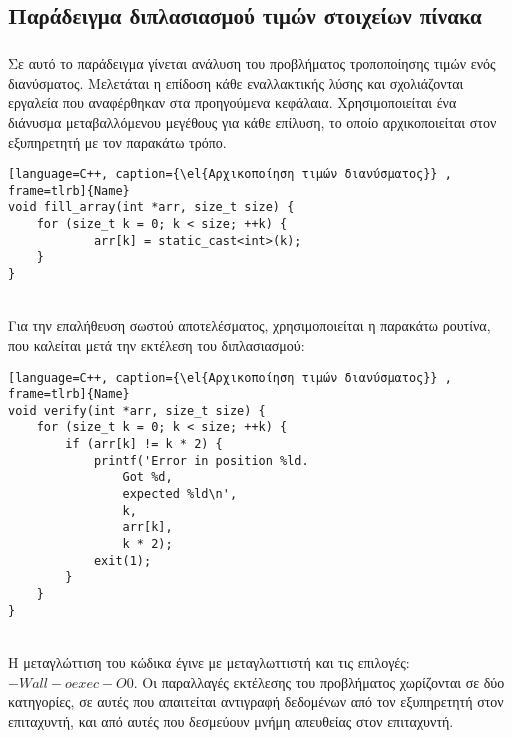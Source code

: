 \subsection{Παράδειγμα διπλασιασμού τιμών στοιχείων πίνακα}
\subparagraph{}
Σε αυτό το παράδειγμα γίνεται ανάλυση του προβλήματος τροποποίησης τιμών ενός διανύσματος. Μελετάται η επίδοση κάθε εναλλακτικής λύσης και σχολιάζονται εργαλεία που αναφέρθηκαν στα προηγούμενα κεφάλαια. Χρησιμοποιείται ένα διάνυσμα μεταβαλλόμενου μεγέθους για κάθε επίλυση, το οποίο αρχικοποιείται στον εξυπηρετητή με τον παρακάτω τρόπο.
\begin{lstlisting}[language=C++, caption={\el{Αρχικοποίηση τιμών διανύσματος}} , frame=tlrb]{Name}
void fill_array(int *arr, size_t size) {
    for (size_t k = 0; k < size; ++k) {
            arr[k] = static_cast<int>(k);
    }
}
\end{lstlisting}
\ \\
Για την επαλήθευση σωστού αποτελέσματος, χρησιμοποιείται η παρακάτω ρουτίνα, που καλείται μετά την εκτέλεση του διπλασιασμού:
\ \\
\begin{lstlisting}[language=C++, caption={\el{Αρχικοποίηση τιμών διανύσματος}} , frame=tlrb]{Name}
void verify(int *arr, size_t size) {
	for (size_t k = 0; k < size; ++k) {
		if (arr[k] != k * 2) {
        	printf('Error in position %ld.
        		Got %d, 
        		expected %ld\n', 
        		k, 
        		arr[k], 
        		k * 2);
			exit(1);
		}
	}
}
\end{lstlisting}
\ \\
Η μεταγλώττιση του κώδικα έγινε με μεταγλωττιστή \emph{} και τις επιλογές:$-Wall -o exec -O0$. Οι παραλλαγές εκτέλεσης του προβλήματος χωρίζονται σε δύο κατηγορίες, σε αυτές που απαιτείται αντιγραφή δεδομένων από τον εξυπηρετητή στον επιταχυντή, και από αυτές που δεσμεύουν μνήμη απευθείας στον επιταχυντή.

\clearpage
